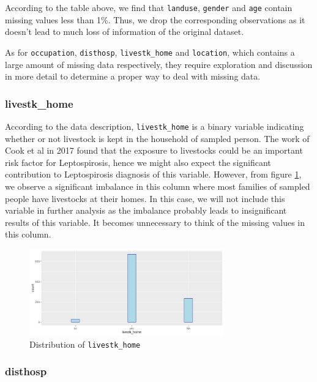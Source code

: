 \documentclass[11pt,twoside]{article}
\numberwithin{Theorem}{section}
\numberwithin{Definition}{section}
\numberwithin{Lemma}{section}
\numberwithin{Algorithm}{section}
\numberwithin{equation}{section}
\begin{document}
According to the table above, we find that \texttt{landuse}, \texttt{gender} and \texttt{age} contain missing values less than 1\%. Thus, we drop the corresponding observations as it doesn't lead to much loss of information of the original dataset.

As for \texttt{occupation}, \texttt{disthosp}, \texttt{livestk\_home} and \texttt{location}, which contains a large amount of missing data respectively, they require exploration and discussion in more detail to determine a proper way to deal with missing data.

\subsubsection{livestk\_home}

According to the data description, \texttt{livestk\_home} is a binary variable indicating whether or not livestock is kept in the household of sampled person. The work of Cook et al in 2017 \cite{cook2017risk} found that the exposure to livestocks could be an important risk factor for Leptospirosis, hence we might also expect the significant contribution to Leptospirosis diagnosis of this variable. However, from figure \ref{fig:livestk}, we observe a significant imbalance in this column where most families of sampled people have livestocks at their homes. In this case, we will not include this variable in further analysis as the imbalance probably leads to insignificant results of this variable. It becomes unnecessary to think of the missing values in this column.

\begin{figure}[!h]
	\centering
	\includegraphics[width = 0.75\textwidth]{Images/livestk.png}
	\caption{Distribution of \texttt{livestk\_home}}
	\label{fig:livestk}
\end{figure}

\subsubsection{disthosp}
\end{document}

